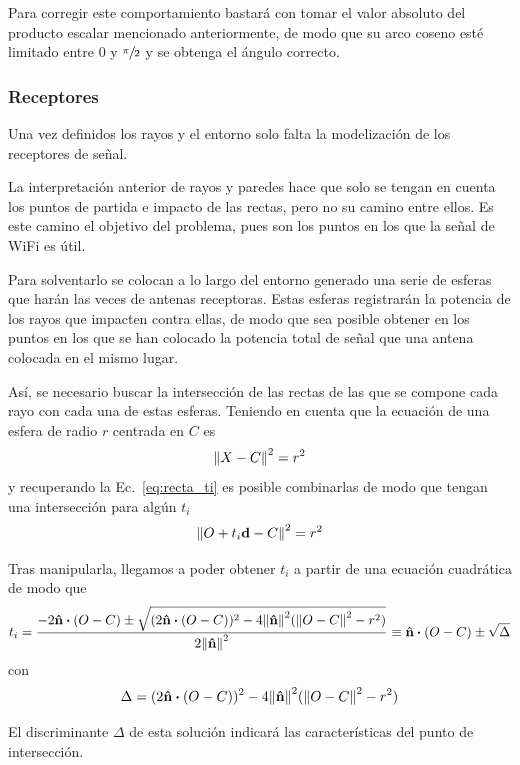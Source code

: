 Para corregir este comportamiento bastará con tomar el valor absoluto del producto escalar mencionado anteriormente, de modo que su arco coseno esté limitado entre 0 y $\sfrac{\pi}{2}$ y se obtenga el ángulo correcto.

\subsubsection{Receptores}
Una vez definidos los rayos y el entorno solo falta la modelización de los receptores de señal.

La interpretación anterior de rayos y paredes hace que solo se tengan en cuenta los puntos de partida e impacto de las rectas, pero no su camino entre ellos.
Es este camino el objetivo del problema, pues son los puntos en los que la señal de WiFi es útil.

Para solventarlo se colocan a lo largo del entorno generado una serie de esferas que harán las veces de antenas receptoras.
Estas esferas registrarán la potencia de los rayos que impacten contra ellas, de modo que sea posible obtener en los puntos en los que se han colocado la potencia total de señal que una antena colocada en el mismo lugar.

Así, se necesario buscar la intersección de las rectas de las que se compone cada rayo con cada una de estas esferas.
Teniendo en cuenta que la ecuación de una esfera de radio $r$ centrada en $C$ es 
\begin{equation}
    \label{eq:esfera}
    \norm{X-C}^2 = r^2
\end{equation}
y recuperando la Ec.~\eqref{eq:recta_ti} es posible combinarlas de modo que tengan una intersección para algún $t_i$
\begin{equation}
    \norm{O + t_i\vb{d} -C}^2 = r^2
\end{equation}

Tras manipularla, llegamos a poder obtener $t_i$ a partir de una ecuación cuadrática de modo que
\begin{equation}
    \label{eq:esfera_ti}
    t_i = \frac{-2\vu{n}\vdot(O - C) \pm \sqrt{(2\vu{n}\vdot(O - C))^2 - 4\norm{\vu{n}}^2(\norm{O-C}^2-r^2)}}{2\norm{\vu{n}}^2} \equiv \vu{n}\vdot(O - C) \pm \sqrt{\Delta}
\end{equation}
con 
\begin{equation}
    \Delta = (2\vu{n}\vdot(O - C))^2 - 4\norm{\vu{n}}^2(\norm{O-C}^2-r^2)
\end{equation}

El discriminante $\Delta$ de esta solución indicará las características del punto de intersección.

